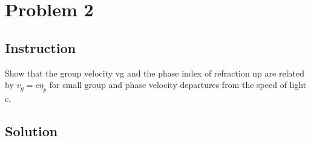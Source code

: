\section{Problem 2}

\subsection{Instruction}

Show that the group velocity vg and the phase index of refraction np are related
by $v_g = c \eta_p$ for small group and phase velocity departures from the speed
of light $c$.

\subsection{Solution}


